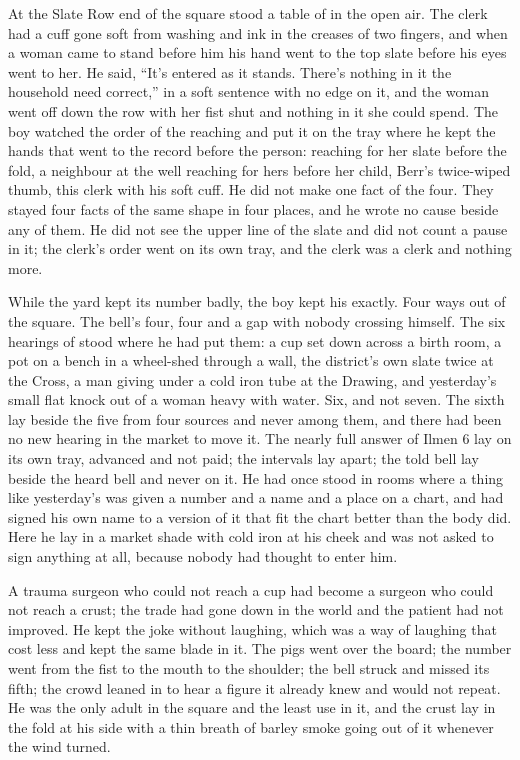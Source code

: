 At the Slate Row end of the square stood a table of  in the open air. The clerk had a cuff gone soft from washing and ink in the creases of two fingers, and when a woman came to stand before him his hand went to the top slate before his eyes went to her. He said, “It's entered as it stands. There's nothing in it the household need correct,” in a soft sentence with no edge on it, and the woman went off down the row with her fist shut and nothing in it she could spend. The boy watched the order of the reaching and put it on the tray where he kept the hands that went to the record before the person:  reaching for her slate before the fold, a neighbour at the well reaching for hers before her child, Berr's twice-wiped thumb, this clerk with his soft cuff. He did not make one fact of the four. They stayed four facts of the same shape in four places, and he wrote no cause beside any of them. He did not see the upper line of the slate and did not count a pause in it; the clerk's order went on its own tray, and the clerk was a clerk and nothing more.

While the yard kept its number badly, the boy kept his exactly. Four ways out of the square. The bell's four, four and a gap with nobody crossing himself. The six hearings of  stood where he had put them: a cup set down across a birth room, a pot on a bench in a wheel-shed through a wall, the district's own slate twice at the Cross, a man giving under a cold iron tube at the Drawing, and yesterday's small flat knock out of a woman heavy with water. Six, and not seven. The sixth lay beside the five from four sources and never among them, and there had been no new hearing in the market to move it. The nearly full answer of Ilmen 6 lay on its own tray, advanced and not paid; the intervals lay apart; the told bell lay beside the heard bell and never on it. He had once stood in rooms where a thing like yesterday's was given a number and a name and a place on a chart, and had signed his own name to a version of it that fit the chart better than the body did. Here he lay in a market shade with cold iron at his cheek and was not asked to sign anything at all, because nobody had thought to enter him.

A trauma surgeon who could not reach a cup had become a surgeon who could not reach a crust; the trade had gone down in the world and the patient had not improved. He kept the joke without laughing, which was a way of laughing that cost less and kept the same blade in it. The pigs went over the board; the number went from the fist to the mouth to the shoulder; the bell struck and missed its fifth; the crowd leaned in to hear a figure it already knew and would not repeat. He was the only adult in the square and the least use in it, and the crust lay in the fold at his side with a thin breath of barley smoke going out of it whenever the wind turned.

